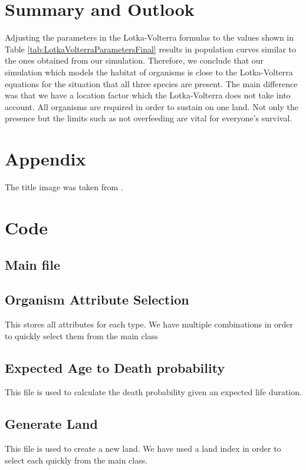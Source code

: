 \documentclass[11pt]{article}
\begin{document}
\section{Summary and Outlook}

Adjusting the parameters in the Lotka-Volterra formulas to the values shown in Table \ref{tab:LotkaVolterraParametersFinal} results in  population curves similar to the ones obtained from our simulation. Therefore, we conclude that our simulation which models the habitat of organisms is close to the Lotka-Volterra equations for the situation that all three species are present. The main difference was that we have a location factor which the Lotka-Volterra does not take into account. All organisms are required in order to sustain on one land. Not only the presence but the limits such as not overfeeding are vital for everyone's survival. 
\appendix

\section{Appendix}
The title image was taken from \cite{titleImage}.

\section{Code}
\subsection{Main file}

\subsection{Organism Attribute Selection}
This stores all attributes for each type. We have multiple combinations in order to quickly select them from the main class

\subsection{Expected Age to Death probability}
This file is used to calculate the death probability given an expected life duration.

\subsection{Generate Land}
This file is used to create a new land. We have used a land index in order to select each quickly from the main class.

\end{document}
